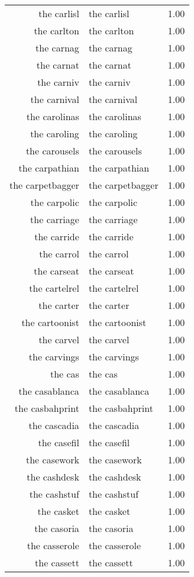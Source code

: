\begin{table}[ht]
\begin{tabular}{rlr}
  the carlisl & the carlisl & 1.00 \\ 
  the carlton & the carlton & 1.00 \\ 
  the carnag & the carnag & 1.00 \\ 
  the carnat & the carnat & 1.00 \\ 
  the carniv & the carniv & 1.00 \\ 
  the carnival & the carnival & 1.00 \\ 
  the carolinas & the carolinas & 1.00 \\ 
  the caroling & the caroling & 1.00 \\ 
  the carousels & the carousels & 1.00 \\ 
  the carpathian & the carpathian & 1.00 \\ 
  the carpetbagger & the carpetbagger & 1.00 \\ 
  the carpolic & the carpolic & 1.00 \\ 
  the carriage & the carriage & 1.00 \\ 
  the carride & the carride & 1.00 \\ 
  the carrol & the carrol & 1.00 \\ 
  the carseat & the carseat & 1.00 \\ 
  the cartelrel & the cartelrel & 1.00 \\ 
  the carter & the carter & 1.00 \\ 
  the cartoonist & the cartoonist & 1.00 \\ 
  the carvel & the carvel & 1.00 \\ 
  the carvings & the carvings & 1.00 \\ 
  the cas & the cas & 1.00 \\ 
  the casablanca & the casablanca & 1.00 \\ 
  the casbahprint & the casbahprint & 1.00 \\ 
  the cascadia & the cascadia & 1.00 \\ 
  the casefil & the casefil & 1.00 \\ 
  the casework & the casework & 1.00 \\ 
  the cashdesk & the cashdesk & 1.00 \\ 
  the cashstuf & the cashstuf & 1.00 \\ 
  the casket & the casket & 1.00 \\ 
  the casoria & the casoria & 1.00 \\ 
  the casserole & the casserole & 1.00 \\ 
  the cassett & the cassett & 1.00 \\ 

\end{tabular}
\end{table}
